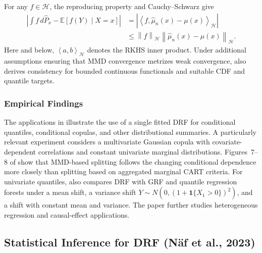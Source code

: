 \documentclass[12pt,a4paper]{article}
\newcommand{\E}{\mathbb E}
\newcommand{\calH}{\mathcal H}
\newcommand{\1}{\mathbf 1}
\newcommand{\norm}[1]{\left\lVert#1\right\rVert}
\newcommand{\ip}[2]{\left\langle#1,#2\right\rangle}
\begin{document}
For any $f\in\calH$, the reproducing property and Cauchy--Schwarz give
\begin{align}\label{eq:functionalrate}
 \left|\int f\,d\widehat P_x-\E[f(Y)\mid X=x]\right|
 &=\left|\ip{f}{\widehat\mu_n(x)-\mu(x)}_{\calH}\right|\\
 &\le\norm{f}_{\calH}\norm{\widehat\mu_n(x)-\mu(x)}_{\calH}.
 \nonumber
\end{align}
Here and below, $\ip{a}{b}_{\calH}$ denotes the RKHS inner product. Under additional assumptions ensuring that MMD convergence metrizes weak convergence, \cite[Corollaries~4--5]{cevid2022} also derives consistency for bounded continuous functionals and suitable CDF and quantile targets.


\subsubsection{Empirical Findings}
The applications in \cite[Section~4]{cevid2022} illustrate the use of a single fitted DRF for conditional quantiles, conditional copulas, and other distributional summaries. A particularly relevant experiment considers a multivariate Gaussian copula with covariate-dependent correlations and constant univariate marginal distributions. Figures~7--8 of \cite{cevid2022} show that MMD-based splitting follows the changing conditional dependence more closely than splitting based on aggregated marginal CART criteria. For univariate quantiles, \cite[Section~4.2]{cevid2022} also compares DRF with GRF and quantile regression forests under a mean shift, a variance shift $Y\sim N(0,(1+\1\{X_1>0\})^2)$, and a shift with constant mean and variance. The paper further studies heterogeneous regression and causal-effect applications.

\subsection{Statistical Inference for DRF (N\"af et al., 2023)}\label{sec:inference}
\end{document}

